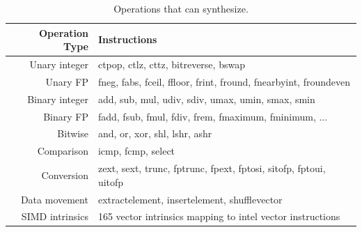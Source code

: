 \begin{table}[tbp]
  \centering
  \caption{Operations that \minotaur{} can synthesize.}
  \begin{tabular}{ r | l }
    \toprule
    \textbf{Operation Type} & \textbf{Instructions} \\
    \hline
    Unary integer & ctpop, ctlz, cttz, bitreverse, bswap \\
    Unary FP & fneg, fabs, fceil, ffloor, frint, fround, fnearbyint, froundeven \\
    Binary integer & add, sub, mul, udiv, sdiv, umax, umin, smax, smin\\
    Binary FP & fadd, fsub, fmul, fdiv, frem, fmaximum, fminimum, ... \\
    Bitwise & and, or, xor, shl, lshr, ashr \\
    Comparison & icmp, fcmp, select \\
    Conversion & zext, sext, trunc, fptrunc, fpext, fptosi, sitofp, fptoui, uitofp \\
    Data movement & extractelement, insertelement, shufflevector \\
    SIMD intrinsics & 165 vector intrinsics mapping to intel vector instructions \\
    \bottomrule
  \end{tabular}
  \label{tab:operations}
\end{table}



